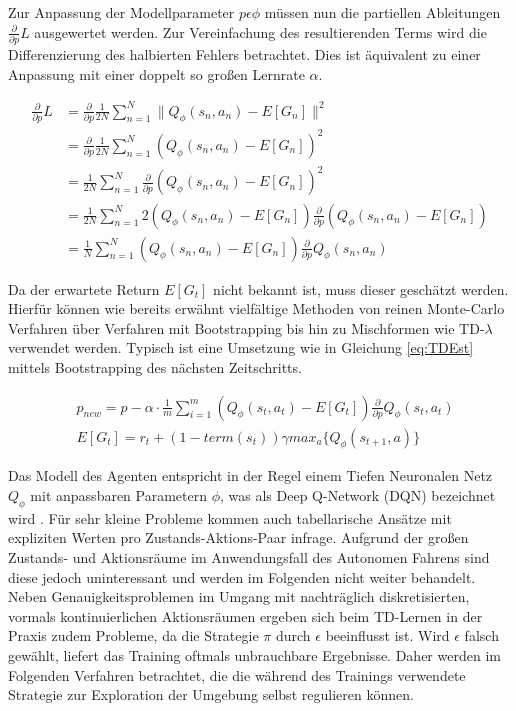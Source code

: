 Zur Anpassung der Modellparameter $p \epsilon \phi$ müssen nun die partiellen Ableitungen
$\frac{\partial}{\partial p} L$ ausgewertet werden. Zur Vereinfachung des resultierenden
Terms wird die Differenzierung des halbierten Fehlers betrachtet. Dies ist äquivalent
zu einer Anpassung mit einer doppelt so großen Lernrate $\alpha$.

\begin{equation}
\begin{aligned}
\frac{\partial}{\partial p} L
&= \frac{\partial}{\partial p} \frac{1}{2N} \sum_{n=1}^N \lVert Q_\phi(s_n, a_n) - E[G_n] \rVert^2\\
&= \frac{\partial}{\partial p} \frac{1}{2N} \sum_{n=1}^N (Q_\phi(s_n, a_n) - E[G_n])^2\\
&= \frac{1}{2N} \sum_{n=1}^N \frac{\partial}{\partial p} (Q_\phi(s_n, a_n) - E[G_n])^2\\
&= \frac{1}{2N} \sum_{n=1}^N 2(Q_\phi(s_n, a_n) - E[G_n])
      \frac{\partial}{\partial p} (Q_\phi(s_n, a_n) - E[G_n])\\
&= \frac{1}{N} \sum_{n=1}^N (Q_\phi(s_n, a_n) - E[G_n])
      \frac{\partial}{\partial p} Q_\phi(s_n, a_n)
\end{aligned}
\end{equation}

Da der erwartete Return $E[G_t]$ nicht bekannt ist, muss dieser geschätzt werden.
Hierfür können wie bereits erwähnt vielfältige Methoden von reinen Monte-Carlo Verfahren
über Verfahren mit Bootstrapping bis hin zu Mischformen wie TD-$\lambda$ verwendet werden.
Typisch ist eine Umsetzung wie in Gleichung \ref{eq:TDEst} mittels Bootstrapping
des nächsten Zeitschritts.

\begin{equation}
\begin{aligned}
&p_{new} = p - \alpha \cdot \frac{1}{m} \sum_{i=1}^m (Q_\phi(s_t, a_t) - E[G_t])
    \frac{\partial}{\partial p} Q_\phi(s_t, a_t)\\
&E[G_t] = r_t + (1 - term(s_t)) \gamma max_a \{ Q_\phi(s_{t+1}, a) \}\label{eq:TDEst}
\end{aligned}
\end{equation}

Das Modell des Agenten entspricht in der Regel einem Tiefen Neuronalen Netz $Q_\phi$
mit anpassbaren Parametern $\phi$, was als Deep Q-Network (DQN) bezeichnet wird
\cite{mnih2013dqn}. Für sehr kleine Probleme kommen auch tabellarische Ansätze mit
expliziten Werten pro Zustands-Aktions-Paar infrage. Aufgrund der großen Zustands-
und Aktionsräume im Anwendungsfall des Autonomen Fahrens sind diese jedoch uninteressant
und werden im Folgenden nicht weiter behandelt. Neben Genauigkeitsproblemen im Umgang mit
nachträglich diskretisierten, vormals kontinuierlichen Aktionsräumen ergeben sich beim
TD-Lernen in der Praxis zudem Probleme, da die Strategie $\pi$ durch $\epsilon$ beeinflusst
ist. Wird $\epsilon$ falsch gewählt, liefert das Training oftmals unbrauchbare Ergebnisse.
Daher werden im Folgenden Verfahren betrachtet, die die während des Trainings verwendete
Strategie zur Exploration der Umgebung selbst regulieren können.

